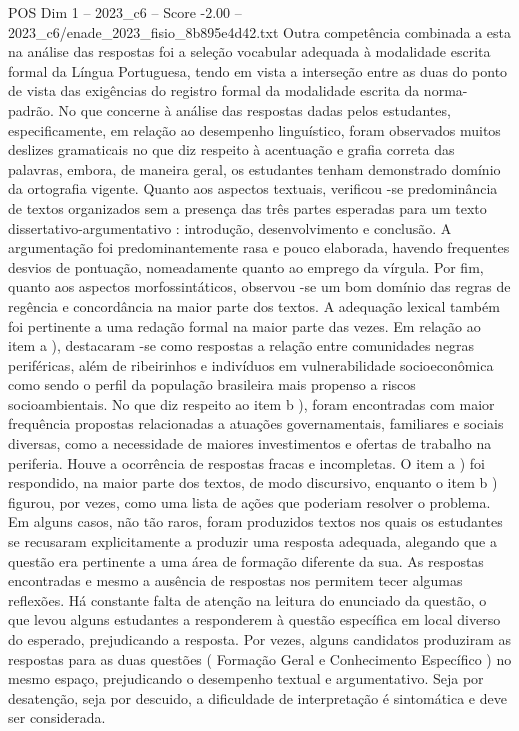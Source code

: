 \begin{textsample}{POS Dim 1 – 2023\_c6 – Score -2.00 – 2023\_c6/enade\_2023\_fisio\_8b895e4d42.txt}
Outra competência combinada a esta na análise das respostas foi a seleção vocabular adequada à modalidade escrita formal da Língua Portuguesa, tendo em vista a interseção entre as duas do ponto de vista das exigências do registro formal da modalidade escrita da norma-padrão.
No que concerne à análise das respostas dadas pelos estudantes, especificamente, em relação ao desempenho linguístico, foram observados muitos deslizes gramaticais no que diz respeito à acentuação e grafia correta das palavras, embora, de maneira geral, os estudantes tenham demonstrado domínio da ortografia vigente.
Quanto aos aspectos textuais, verificou -se predominância de textos organizados sem a presença das três partes esperadas para um texto dissertativo-argumentativo : introdução, desenvolvimento e conclusão.
A argumentação foi predominantemente rasa e pouco elaborada, havendo frequentes desvios de pontuação, nomeadamente quanto ao emprego da vírgula.
Por fim, quanto aos aspectos morfossintáticos, observou -se um bom domínio das regras de regência e concordância na maior parte dos textos.
A adequação lexical também foi pertinente a uma redação formal na maior parte das vezes.
Em relação ao item a ), destacaram -se como respostas a relação entre comunidades negras periféricas, além de ribeirinhos e indivíduos em vulnerabilidade socioeconômica como sendo o perfil da população brasileira mais propenso a riscos socioambientais.
No que diz respeito ao item b ), foram encontradas com maior frequência propostas relacionadas a atuações governamentais, familiares e sociais diversas, como a necessidade de maiores investimentos e ofertas de trabalho na periferia.
Houve a ocorrência de respostas fracas e incompletas.
O item a ) foi respondido, na maior parte dos textos, de modo discursivo, enquanto o item b ) figurou, por vezes, como uma lista de ações que poderiam resolver o problema.
Em alguns casos, não tão raros, foram produzidos textos nos quais os estudantes se recusaram explicitamente a produzir uma resposta adequada, alegando que a questão era pertinente a uma área de formação diferente da sua.
As respostas encontradas e mesmo a ausência de respostas nos permitem tecer algumas reflexões.
Há constante falta de atenção na leitura do enunciado da questão, o que levou alguns estudantes a responderem à questão específica em local diverso do esperado, prejudicando a resposta.
Por vezes, alguns candidatos produziram as respostas para as duas questões ( Formação Geral e Conhecimento Específico ) no mesmo espaço, prejudicando o desempenho textual e argumentativo.
Seja por desatenção, seja por descuido, a dificuldade de interpretação é sintomática e deve ser considerada.

\end{textsample}
